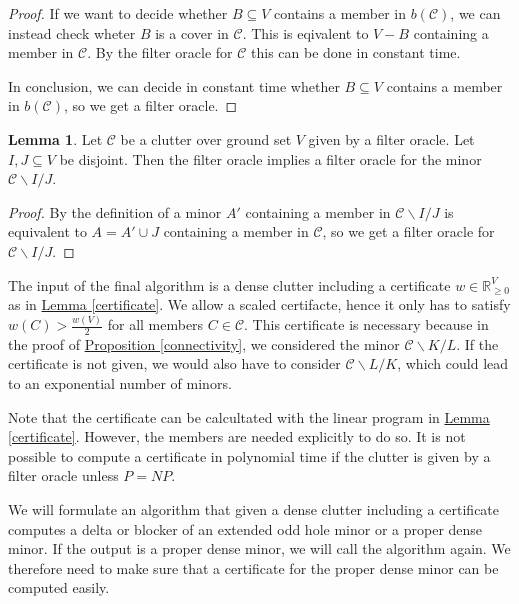 \documentclass[a4paper, 12pt]{scrbook}
\theoremstyle{definition}
\newtheorem{lemma}[theorem]{Lemma}
\newcommand*{\IR}{\ensuremath{\mathbb{R}}}
\begin{document}
   \begin{proof}
       If we want to decide whether $B \subseteq V$ contains a member in $b(\mathcal{C})$, we can instead check wheter $B$ is a cover in $\mathcal{C}$. This is eqivalent to $V-B$ containing a member in $\mathcal{C}$. By the filter oracle for $\mathcal{C}$ this can be done in constant time.

       In conclusion, we can decide in constant time whether $B \subseteq V$ contains a member in $b(\mathcal{C})$, so we get a filter oracle.
   \end{proof}

   \begin{lemma}
       Let $\mathcal{C}$ be a clutter over ground set $V$ given by a filter oracle. Let $I,J \subseteq V$ be disjoint.
       Then the filter oracle implies a filter oracle for the minor $\mathcal{C} \backslash I /J$.
   \end{lemma}

   \begin{proof}
       By the definition of a minor $A'$ containing a member in $\mathcal{C} \backslash I / J$ is equivalent to $A = A' \cup J$ containing a member in $\mathcal{C}$, so we get a filter oracle for $\mathcal{C} \backslash I / J$.
   \end{proof}

   The input of the final algorithm is a dense clutter including a certificate $w \in \IR^V_{\geq 0}$ as in \hyperref[certificate]{Lemma \ref*{certificate}}. We allow a scaled certifacte, hence it only has to satisfy $w(C) > \frac {w(V)}{2}$ for all members $C \in \mathcal{C}$. This certificate is necessary because in the proof of \hyperref[connectivity]{Proposition \ref*{connectivity}}, we considered the minor $\mathcal{C} \backslash K / L$.
   If the certificate is not given, we would also have to consider $\mathcal{C} \backslash L / K$, which could lead to an exponential number of minors.

   Note that the certificate can be calcultated with the linear program in \hyperref[certificate]{Lemma \ref*{certificate}}. However, the members are needed explicitly to do so.
   It is not possible to compute a certificate in polynomial time if the clutter is given by a filter oracle unless $P=NP$.

   We will formulate an algorithm that given a dense clutter including a certificate computes a delta or blocker of an extended odd hole minor or a proper dense minor. If the output is a proper dense minor, we will call the algorithm again. We therefore need to make sure that a certificate for the proper dense minor can be computed easily.
\end{document}
